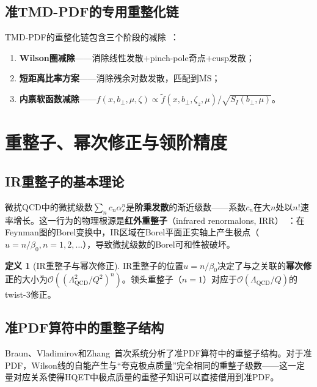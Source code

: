 \documentclass[12pt,a4paper]{ctexart}
\theoremstyle{definition}
\newtheorem{definition}{定义}[section]
\begin{document}
\subsection{准TMD-PDF的专用重整化链}

TMD-PDF的重整化链包含三个阶段的减除~\cite{Zhang2022renormTMD}：
\begin{enumerate}[nosep]
    \item \textbf{Wilson圈减除}——消除线性发散+pinch-pole奇点+cusp发散；
    \item \textbf{短距离比率方案}——消除残余对数发散，匹配到$\overline{\text{MS}}$；
    \item \textbf{内禀软函数减除}——$f(x, b_\perp, \mu, \zeta) \propto \tilde f(x, b_\perp, \zeta_z, \mu)/\sqrt{S_I(b_\perp, \mu)}$。
\end{enumerate}

\section{重整子、幂次修正与领阶精度}

\subsection{IR重整子的基本理论}

微扰QCD中的微扰级数$\sum_n c_n \alpha_s^n$是\textbf{阶乘发散}的渐近级数——系数$c_n$在大$n$处以$n!$速率增长。这一行为的物理根源是\textbf{红外重整子}（infrared renormalons, IRR）~\cite{Beneke1999renormalon}：在Feynman图的Borel变换中，IR区域在Borel平面正实轴上产生极点（$u = n/\beta_0, n = 1, 2, \dots$），导致微扰级数的Borel可和性被破坏。

\begin{definition}[IR重整子与幂次修正]
IR重整子的位置$u = n/\beta_0$决定了与之关联的\textbf{幂次修正}的大小为$\mathcal{O}((\Lambda_{\text{QCD}}^2/Q^2)^n)$。领头重整子（$n=1$）对应于$\mathcal{O}(\Lambda_{\text{QCD}}/Q)$的twist-3修正。
\end{definition}

\subsection{准PDF算符中的重整子结构}

Braun、Vladimirov和Zhang~\cite{Braun2019power}首次系统分析了准PDF算符中的重整子结构。对于准PDF，Wilson线的自能产生与``夸克极点质量''完全相同的重整子级数——这一定量对应关系使得HQET中极点质量的重整子知识可以直接借用到准PDF。
\end{document}
